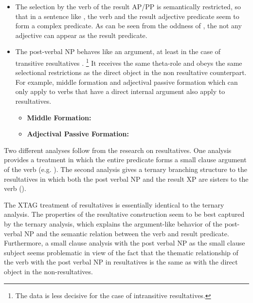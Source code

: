 \begin{itemize}

\item The selection by the verb of the result AP/PP is semantically
restricted, so that in a sentence like , the verb and the result
adjective predicate seem to form a complex predicate. As can be seen from
the oddness of , the not any adjective can appear as the result
predicate.


\item The post-verbal NP behaves like an argument, at least in the case of
transitive resultatives \cite{carrier92}.%
\footnote{The data is less decisive for the case of intransitive
resultatives.%
%
} It receives the same theta-role and obeys the same selectional
restrictions as the direct object in the non resultative counterpart. For
example, middle formation and adjectival passive formation which can only
apply to verbs that have a direct internal argument also apply to
resultatives.

\begin{itemize}

\item {\bf Middle Formation:} 


\item {\bf Adjectival Passive Formation:}
 

\end{itemize}

\end{itemize}
	
Two different analyses follow from the research on resultatives. One
analysis provides a treatment in which the entire predicate forms a small
clause argument of the verb (e.g. \cite{hoekstra88}). The second analysis
gives a ternary branching structure to the resultatives in which both the
post verbal NP and the result XP are sisters to the verb
(\cite{carrier92}).

The XTAG treatment of resultatives is essentially identical to the ternary
analysis. The properties of the resultative construction seem to be best
captured by the ternary analysis, which explains the argument-like behavior
of the post-verbal NP and the semantic relation between the verb and result
predicate. Furthermore, a small clause analysis with the post verbal NP as
the small clause subject seems problematic in view of the fact that the
thematic relationship of the verb with the post verbal NP in resultatives
is the same as with the direct object in the non-resultatives.

